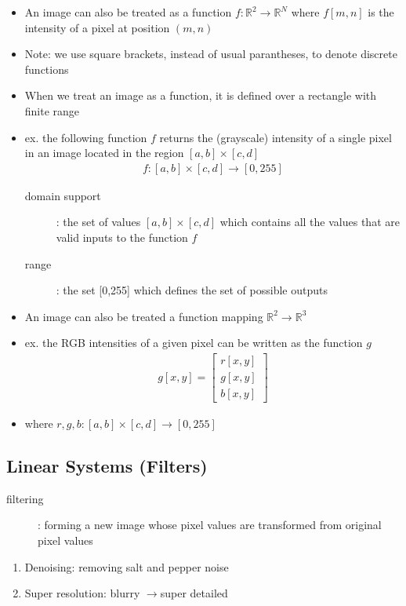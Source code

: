 \documentclass[letterpaper,12pt]{article}
\newcommand{\lra}{\ensuremath{\longrightarrow{}}}
\begin{document}
\begin{itemize}
 \item An image can also be treated as a function $f: \mathbb{R}^2 \to \mathbb{R}^N$ where $f[m,n]$ is the intensity of a pixel at position $(m,n)$
 \item Note: we use square brackets, instead of usual parantheses, to denote discrete functions
 \item When we treat an image as a function, it is defined over a rectangle with finite range
 \item ex. the following function $f$ returns the (grayscale) intensity of a single pixel in an image located in the region $[a,b] \times [c,d]$
       \begin{align}
        f: [a,b] \times [c,d] \to [0,255] \tag{Grayscale Pixel Intensity}
       \end{align}
       \begin{description}
        \item[domain support]: the set of values $[a,b] \times [c,d]$ which contains all the values that are valid inputs to the function $f$
        \item[range]: the set [0,255] which defines the set of possible outputs
       \end{description}
 \item An image can also be treated a function mapping $\mathbb{R}^2 \to \mathbb{R}^3$
 \item ex. the RGB intensities of a given pixel can be written as the function $g$
       \begin{align}
        g[x, y] = \begin{bmatrix} r[x, y] \\ g[x, y] \\ b[x, y] \end{bmatrix} \tag{Color Pixel Intensity}
       \end{align}
 \item where $r,g,b: [a,b] \times [c,d] \to [0,255]$
\end{itemize}

\subsection{Linear Systems (Filters)}
\begin{description}
 \item[filtering]: forming a new image whose pixel values are transformed from original pixel values
\end{description}
\begin{enumerate}
 \item Denoising: removing salt and pepper noise
 \item Super resolution: blurry \lra super detailed
\end{enumerate}
\end{document}
